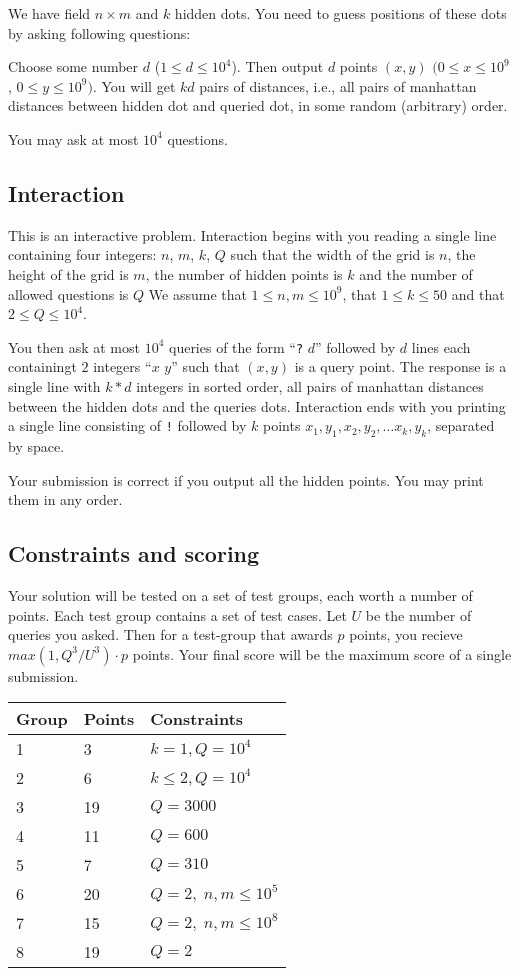We have field $n \times m$ and $k$ hidden dots.
You need to guess positions of these dots by asking following questions:

Choose some number $d$ ($1 \leq d \leq 10^4$).
Then output $d$ points $(x, y)$  $(0 \leq x \leq 10^9$, $0 \leq y \leq 10^9)$.
You will get $kd$ pairs of distances, i.e., all pairs of manhattan distances between hidden dot and queried dot, in some random (arbitrary) order.

You may ask at most $10^4$ questions.

\subsection*{Interaction}

This is an interactive problem.
Interaction begins with you reading a single line containing four integers: $n$, $m$, $k$, $Q$ such that the width of the grid is $n$, 
the height of the grid is $m$, the number of hidden points is $k$ and the number of allowed questions is $Q$
We assume that $1\leq n,m\leq 10^9$, that $1 \leq k \leq 50$ and that $2 \le Q \le 10^4$.

You then ask at most $10^4$ queries of the form ``\texttt{?} $d$'' followed by $d$ lines each containingt $2$ integers ``$x$ $y$'' such that $(x,y)$ is a query point.
The response is a single line with $k *d$ integers in sorted order, all pairs of manhattan distances between the hidden dots and the queries dots.
Interaction ends with you printing a single line consisting of \texttt{!} followed by $k$ points $x_1, y_1, x_2, y_2, \ldots x_k, y_k$, separated by space.

Your submission is correct if you output all the hidden points. You may print them in any order.
\subsection*{Constraints and scoring}
Your solution will be tested on a set of test groups, each worth a number of points.
Each test group contains a set of test cases.
Let $U$ be the number of queries you asked. Then for a test-group that awards $p$ points, you recieve $max(1,Q^3/U^3)\cdot p$ points.
Your final score will be the maximum score of a single submission.

\medskip
\begin{tabular}{lll}
Group & Points & Constraints \\\hline
1 & 3   & $k = 1, Q = 10^4$\\
2 & 6   & $k \le 2, Q = 10^4$\\
3 & 19  & $Q = 3000$\\
4 & 11  & $Q = 600$\\
5 & 7   & $Q = 310$\\
6 & 20  & $Q = 2,\; n,m \le 10^5$\\
7 & 15  & $Q = 2,\; n,m \le 10^8$\\
8 & 19  & $Q = 2$
\end{tabular}

